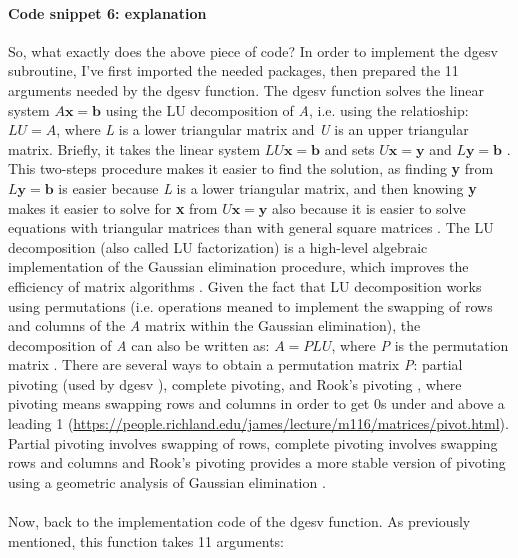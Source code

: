 \documentclass {article}
\begin{document}
\paragraph{Code snippet 6: explanation}
So, what exactly does the above piece of code?
 In order to implement the dgesv subroutine, I've first imported the needed packages, then prepared the 11 arguments needed by the dgesv function. The dgesv function solves the linear system $A\textbf{x}=\textbf{b}$ using the LU decomposition of \textit{A}, i.e. using the relatioship: $LU=A$, where \textit{L} is a lower triangular matrix and \textit{U} is an upper triangular matrix. 
Briefly, it takes the linear system $LU\textbf{x}=\textbf{b}$ and sets $U\textbf{x}=\textbf{y}$ and $L\textbf{y}=\textbf{b}$ \cite{dawkins_pauls_2005} \cite{golub_matrix_2013}.
 This two-steps procedure makes it easier to find the solution, as finding \textbf{y} from $L\textbf{y}=\textbf{b}$ is easier because \textit{L} is a lower triangular matrix, and then knowing \textbf{y} makes it easier to solve for \textbf{x} from $U\textbf{x}=\textbf{y}$ also because it is easier to solve equations with triangular matrices than with general square matrices \cite{dawkins_pauls_2005} \cite{golub_matrix_2013}.
The LU decomposition (also called LU factorization) is a high-level algebraic implementation of the Gaussian elimination procedure, which improves the efficiency of matrix algorithms \cite{golub_matrix_2013}. Given the fact that LU decomposition works using permutations (i.e. operations meaned to implement the swapping of rows and columns of the \textit{A} matrix within the Gaussian elimination), the decomposition of \textit{A} can also be written as: $A= PLU$, where \textit{P} is the permutation matrix \cite{anderson_lapack_1999} \cite{golub_matrix_2013}. 
There are several ways to obtain a permutation matrix \textit{P}: partial pivoting (used by dgesv \cite{anderson_lapack_1999}), complete pivoting, and Rook's pivoting \cite{golub_matrix_2013}, where pivoting means swapping rows and columns in order to get 0s under and above a leading 1 (\href{https://people.richland.edu/james/lecture/m116/matrices/pivot.html}{https://people.richland.edu/james/lecture/m116/matrices/pivot.html}).
 Partial pivoting involves swapping of rows, complete pivoting involves swapping rows and columns \cite{press_numerical_1992} and Rook's pivoting provides a more stable version of pivoting using a geometric analysis of Gaussian elimination \cite{poole_rooks_2000}.
\\
\\
Now, back to the implementation code of the dgesv function. As previously mentioned, this function takes 11 arguments: 
\end{document}
